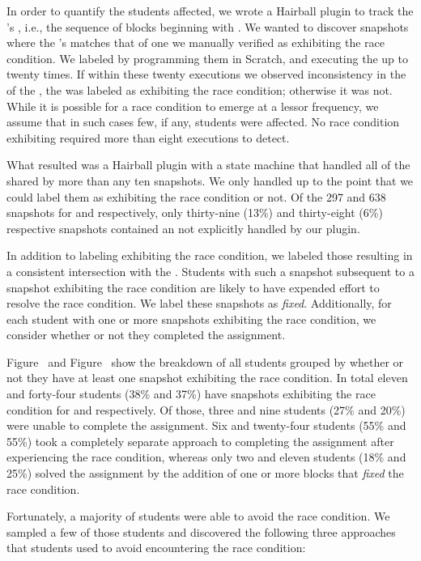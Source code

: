 In order to quantify the students affected, we wrote a Hairball plugin to track
the \net{}'s \exe{}, i.e., the sequence of blocks beginning with
\netclicked{}. We wanted to discover snapshots where the \net{}'s \exe{}
matches that of one we manually verified as exhibiting the race condition. We
labeled  by programming them in Scratch, and executing the \sprogram{}
up to twenty times. If within these twenty executions we observed inconsistency
in the  of the \zebra{}, the \exe{} was labeled as exhibiting the
race condition; otherwise it was not. While it is possible for a race condition
to emerge at a lessor frequency, we assume that in such cases few, if any,
students were affected. No race condition exhibiting  required more than
eight executions to detect.

What resulted was a Hairball plugin with a state machine that handled all
 of the \net{} shared by more than any ten snapshots. We only handled
 up to the point that we could label them as exhibiting the race
condition or not. Of the 297 and 638 snapshots for \sone{} and \stwo{}
respectively, only thirty-nine (13\%) and thirty-eight (6\%) respective
snapshots contained an \exe{} not explicitly handled by our plugin.

In addition to labeling  exhibiting the race condition, we labeled those
resulting in a consistent intersection with the \zebra{}. Students with such a
snapshot subsequent to a snapshot exhibiting the race condition are likely to
have expended effort to resolve the race condition. We label these snapshots as
\emph{fixed}. Additionally, for each student with one or more snapshots
exhibiting the race condition, we consider whether or not they completed the
assignment.

Figure~ and Figure~ show the breakdown
of all students grouped by whether or not they have at least one snapshot
exhibiting the race condition. In total eleven and forty-four students (38\%
and 37\%) have snapshots exhibiting the race condition for \sone{} and \stwo{}
respectively. Of those, three and nine students (27\% and 20\%) were unable to
complete the assignment. Six and twenty-four students (55\% and 55\%) took a
completely separate approach to completing the assignment after experiencing
the race condition, whereas only two and eleven students (18\% and 25\%) solved
the assignment by the addition of one or more blocks that \emph{fixed} the race
condition.

Fortunately, a majority of students were able to avoid the race condition. We
sampled a few of those students and discovered the following three approaches
that students used to avoid encountering the race condition:


